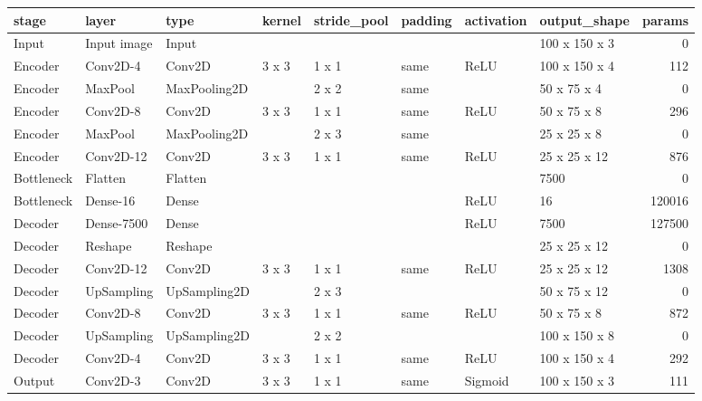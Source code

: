 \begin{tabular}{llllllllr}
\toprule
stage & layer & type & kernel & stride_pool & padding & activation & output_shape & params \\
\midrule
Input & Input image & Input &  &  &  &  & 100 x 150 x 3 & 0 \\
Encoder & Conv2D-4 & Conv2D & 3 x 3 & 1 x 1 & same & ReLU & 100 x 150 x 4 & 112 \\
Encoder & MaxPool & MaxPooling2D &  & 2 x 2 & same &  & 50 x 75 x 4 & 0 \\
Encoder & Conv2D-8 & Conv2D & 3 x 3 & 1 x 1 & same & ReLU & 50 x 75 x 8 & 296 \\
Encoder & MaxPool & MaxPooling2D &  & 2 x 3 & same &  & 25 x 25 x 8 & 0 \\
Encoder & Conv2D-12 & Conv2D & 3 x 3 & 1 x 1 & same & ReLU & 25 x 25 x 12 & 876 \\
Bottleneck & Flatten & Flatten &  &  &  &  & 7500 & 0 \\
Bottleneck & Dense-16 & Dense &  &  &  & ReLU & 16 & 120016 \\
Decoder & Dense-7500 & Dense &  &  &  & ReLU & 7500 & 127500 \\
Decoder & Reshape & Reshape &  &  &  &  & 25 x 25 x 12 & 0 \\
Decoder & Conv2D-12 & Conv2D & 3 x 3 & 1 x 1 & same & ReLU & 25 x 25 x 12 & 1308 \\
Decoder & UpSampling & UpSampling2D &  & 2 x 3 &  &  & 50 x 75 x 12 & 0 \\
Decoder & Conv2D-8 & Conv2D & 3 x 3 & 1 x 1 & same & ReLU & 50 x 75 x 8 & 872 \\
Decoder & UpSampling & UpSampling2D &  & 2 x 2 &  &  & 100 x 150 x 8 & 0 \\
Decoder & Conv2D-4 & Conv2D & 3 x 3 & 1 x 1 & same & ReLU & 100 x 150 x 4 & 292 \\
Output & Conv2D-3 & Conv2D & 3 x 3 & 1 x 1 & same & Sigmoid & 100 x 150 x 3 & 111 \\
\bottomrule
\end{tabular}
